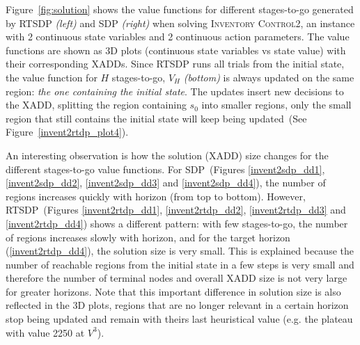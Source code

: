 \documentclass[letterpaper]{article}
\newcommand{\Invent}{\textsc{Inventory Control}}
\begin{document}
Figure~\ref{fig:solution} shows the value functions for different stages-to-go generated by RTSDP \emph{(left)} and SDP \emph{(right)} when solving \Invent2, an instance with 2 continuous state variables and 2 continuous action parameters. The value functions are shown as 3D plots (continuous state variables vs state value) with their corresponding XADDs.
Since RTSDP runs all trials from the initial state, the value function for $H$ stages-to-go, $V_H$ {\it (bottom)} is always updated on the same region: \emph{the one containing the initial state}.
The updates insert new decisions to the XADD, splitting the region containing $s_0$ into smaller regions, only the small region that still contains the initial state will keep being updated~(See Figure~\ref{invent2rtdp_plot4}).

An interesting observation is how the solution (XADD) size %
changes for the different stages-to-go value functions. For SDP~(Figures \ref{invent2sdp_dd1}, \ref{invent2sdp_dd2}, \ref{invent2sdp_dd3} and \ref{invent2sdp_dd4}), the number of regions increases quickly with horizon (from top to bottom).
However, RTSDP~(Figures \ref{invent2rtdp_dd1}, \ref{invent2rtdp_dd2}, \ref{invent2rtdp_dd3} and \ref{invent2rtdp_dd4}) shows a different pattern: with few stages-to-go, the number of regions increases slowly with horizon, and for the target horizon (\ref{invent2rtdp_dd4}), the solution size is very small. This is explained because the number of reachable regions from the initial state in a few steps is very small and therefore the number of terminal nodes and overall XADD size is not very large for greater horizons.
Note that this important difference in solution size is also reflected in the 3D plots, regions that are no longer relevant in a certain horizon stop being updated and remain with theirs last heuristical value (e.g. the plateau with value 2250 at $V^3$).
\end{document}
